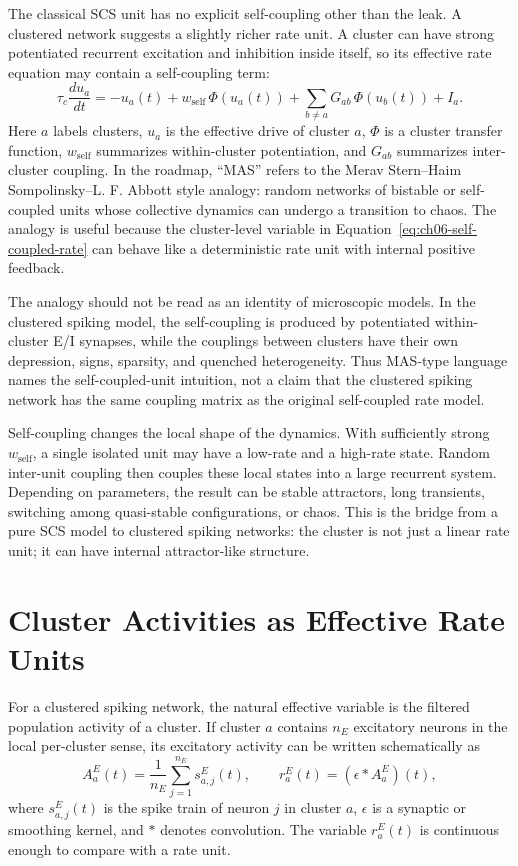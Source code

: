 The classical SCS unit has no explicit self-coupling other than the leak. A
clustered network suggests a slightly richer rate unit. A cluster can have strong
potentiated recurrent excitation and inhibition inside itself, so its effective
rate equation may contain a self-coupling term:
\[
        \tau_c \frac{d u_a}{dt}
        =
        -u_a(t)
        + w_{\mathrm{self}}\,\Phi(u_a(t))
        + \sum_{b\ne a} G_{ab}\,\Phi(u_b(t))
        + I_a .
        \label{eq:ch06-self-coupled-rate}
\]
Here \(a\) labels clusters, \(u_a\) is the effective drive of cluster \(a\),
\(\Phi\) is a cluster transfer function, \(w_{\mathrm{self}}\) summarizes
within-cluster potentiation, and \(G_{ab}\) summarizes inter-cluster coupling.
In the roadmap, ``MAS'' refers to the Merav Stern--Haim
Sompolinsky--L. F. Abbott style analogy: random networks of bistable or
self-coupled units whose collective dynamics can undergo a transition to chaos.
The analogy is useful because the cluster-level variable in
Equation~\eqref{eq:ch06-self-coupled-rate} can behave like a deterministic
rate unit with internal positive feedback.

The analogy should not be read as an identity of microscopic models. In the
clustered spiking model, the self-coupling is produced by potentiated
within-cluster E/I synapses, while the couplings between clusters have their
own depression, signs, sparsity, and quenched heterogeneity. Thus MAS-type
language names the self-coupled-unit intuition, not a claim that the clustered
spiking network has the same coupling matrix as the original self-coupled rate
model.

Self-coupling changes the local shape of the dynamics. With sufficiently strong
\(w_{\mathrm{self}}\), a single isolated unit may have a low-rate and a high-rate
state. Random inter-unit coupling then couples these local states into a
large recurrent system. Depending on parameters, the result can be stable
attractors, long transients, switching among quasi-stable configurations, or
chaos. This is the bridge from a pure SCS model to clustered spiking networks:
the cluster is not just a linear rate unit; it can have internal attractor-like
structure.

\section{Cluster Activities as Effective Rate Units}
\label{sec:ch06-cluster-rate-units}

For a clustered spiking network, the natural effective variable is the filtered
population activity of a cluster. If cluster \(a\) contains \(n_E\) excitatory
neurons in the local per-cluster sense, its excitatory activity can be written
schematically as
\[
        A_a^E(t)
        =
        \frac{1}{n_E}\sum_{j=1}^{n_E}s_{a,j}^E(t),
        \qquad
        r_a^E(t)
        =
        (\epsilon * A_a^E)(t),
        \label{eq:ch06-cluster-activity}
\]
where \(s_{a,j}^E(t)\) is the spike train of neuron \(j\) in cluster \(a\),
\(\epsilon\) is a synaptic or smoothing kernel, and \(*\) denotes convolution.
The variable \(r_a^E(t)\) is continuous enough to compare with a rate unit.

